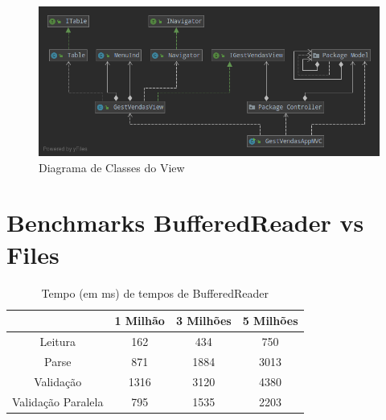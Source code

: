 \documentclass[a4paper]{report}
\begin{document}
\begin{figure}[H]
    \begin{center}
        \includegraphics[width=1\textwidth]{controllerGraph.png}\par
        \caption{Diagrama de Classes do View}
    \end{center}
\end{figure}

\chapter{Benchmarks BufferedReader vs Files}\label{chap:brf}

\begin{table}[H]
    \begin{center}
        \begin{tabular}{| c | c | c | c |}
            \hline
            & 1 Milhão & 3 Milhões & 5 Milhões \\
            \hline
            Leitura & 162 & 434 & 750 \\
            \hline
            Parse & 871 & 1884 & 3013 \\
            \hline
            Validação & 1316 & 3120 & 4380 \\
            \hline
            Validação Paralela & 795 & 1535 & 2203 \\
            \hline

        \end{tabular}
        \caption{Tempo (em ms) de tempos de BufferedReader} 
        \label{tab:BF}
    \end{center}
\end{table}
\end{document}
